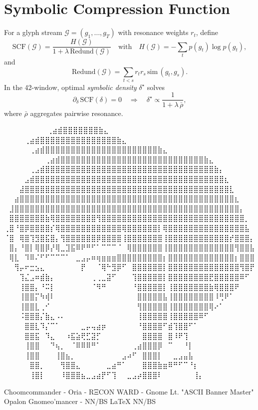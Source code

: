 
\section*{Symbolic Compression Function}

For a glyph stream $\mathcal{G}=(g_1,\dots,g_T)$ with resonance weights $r_t$, define
\[
\mathrm{SCF}(\mathcal{G})= \frac{H(\mathcal{G})}{1+\lambda\,\mathrm{Redund}(\mathcal{G})}
\quad\text{with}\quad
H(\mathcal{G})=-\sum_{t} p(g_t)\log p(g_t),
\]
and
\[
\mathrm{Redund}(\mathcal{G})=\sum_{t<s} r_t r_s\,\mathrm{sim}\,(g_t,g_s).
\]
In the 42-window, optimal \emph{symbolic density} $\delta^\star$ solves
\[
\partial_{\delta}\,\mathrm{SCF}(\delta)=0\quad\Rightarrow\quad
\delta^\star \propto \frac{1}{1+\lambda\,\bar{\rho}},
\]
where $\bar{\rho}$ aggregates pairwise resonance.


\iffalse
⠀⠀⠀⠀⠀⠀             ⠀⠀⢀⣴⣾⣿⣿⣿⣿⣿⣿⣿⣷⣄⠀⠀⠀⠀⠀⠀⠀⠀
⠀⠀⠀  ⠀      ⠀⠀⠀⠀⢀⣴⣾⣿⣿⣿⣿⣿⣿⣿⣿⣿⣿⣿⣿⣿⣿⣿⣷⣄⠀⠀⠀⠀⠀⠀⠀⠀
⠀⠀ ⠀   ⠀⠀⠀⠀⠀⢀⣴⣾⣿⣿⣿⣿⣿⣿⣿⣿⣿⣿⣿⣿⣿⣿⣿⣿⣿⣿⣿⣿⣿⣿⣷⣄⠀⠀⠀⠀⠀⠀⠀⠀
⠀⠀⠀⠀⠀⠀⠀⠀⢀⣴⣾⣿⣿⣿⣿⣿⣿⣿⣿⣿⣿⣿⣿⣿⣿⣿⣿⣿⣿⣿⣿⣿⣿⣿⣿⣿⣿⣿⣿⣷⣄⠀⠀⠀⠀⠀⠀⠀⠀
⠀⠀⠀⠀⠀⢀⣠⣾⣿⣿⣿⣿⣿⣿⣿⣿⣿⣿⣿⣿⣿⣿⣿⣿⣿⣿⣿⣿⣿⣿⣿⣿⣿⣿⣿⣿⣿⣿⣿⣿⣿⣷⡄⠀⠀⠀⠀⠀⠀
⠀⠀⠀⠀⣠⣾⣿⣿⣿⣿⣿⣿⣿⣿⣿⣿⣿⣿⣿⣿⣿⣿⣿⣿⣿⣿⣿⣿⣿⣿⣿⣿⣿⣿⣿⣿⣿⣿⣿⣿⣿⣿⣿⣆⠀⠀⠀⠀⠀
⠀⠀⠀⣼⣿⣿⣿⣿⣿⣿⣿⣿⣿⣿⣿⣿⣿⣿⣿⣿⣿⣿⣿⣿⣿⣿⣿⣿⣿⣿⣿⣿⣿⣿⣿⣿⣿⣿⣿⣿⣿⣿⣿⣿⣇⠀⠀⠀⠀
⠀⠀⣴⣿⣿⣿⣿⣿⣿⣿⣿⣿⣿⣿⣿⣿⣿⣿⣿⣿⣿⣿⣿⣿⣿⣿⣿⣿⣿⣿⣿⣿⣿⣿⣿⣿⣿⣿⣿⣿⣿⣿⣿⣿⣿⣆⠀⠀⠀
⠀⣸⣿⣿⣿⣿⣿⣿⣿⣿⣿⣿⣿⣿⣿⣿⣿⣿⣿⣿⣿⣿⣿⣿⣿⣿⣿⣿⣿⣿⣿⣿⣿⣿⣿⣿⣿⣿⣿⣿⣿⣿⣿⣿⣿⣿⡄⠀⠀
⠀⣿⣿⣿⣿⣿⣿⣿⣷⢿⣿⣿⣿⣿⣿⣿⣿⣿⢻⣿⣿⣿⣿⣿⣿⣿⣿⣿⣿⣿⣿⣿⣿⣿⣿⣿⣿⣿⣿⣿⣿⣿⣿⣿⣿⣿⣿⡀⠀
⢀⣿⠘⣿⡿⣿⣿⣿⣿⡎⢿⣿⣿⣿⣿⣿⣿⣿⣿⣿⣿⣿⣿⢿⣿⣿⣿⣿⣿⣿⡇⢿⣿⣿⣿⣿⣿⣿⣿⣿⣿⣿⣿⣿⣿⣿⣿⣧⠀
⠈⣿⠀⢿⣿⢹⣻⣿⣯⣿⡄⢻⣿⣿⣿⣿⣿⣿⡿⣿⣿⣿⣿⢸⣿⣿⣿⣿⣿⣿⣿⢸⣿⣿⣿⣿⣿⣿⣿⣿⣿⣿⣿⣿⡞⣿⣿⣿⡄
⠀⣿⡄⠘⣿⡇⢿⣿⡿⡜⢿⣀⣹⣯⠿⠟⠛⠋⠁⠉⠉⠉⠈⠀⢿⣿⣿⣿⣿⣿⣿⢸⣿⣿⣿⣿⣿⣿⣿⣿⣿⣿⣿⣿⣿⢻⣿⣿⣧
⠀⢿⣇⠀⠹⠿⠌⠋⠋⠉⠉⠉⠁⠀⣀⣠⡤⠶⢶⣶⣶⣶⣿⣿⣿⣿⣿⣿⣿⣿⣿⡆⣿⣿⣿⣿⣿⣿⣿⣿⣿⣿⣿⣿⣿⡆⣿⣿⣿
⠀⠀⢻⡤⠖⣒⣢⣄⠀⠀⠀⠀⠀⠀⠀⡟⠀⠀⠈⢿⠓⣻⡿⠋⠀⣿⣿⣿⣿⣿⣿⡇⣿⣿⣿⣿⣿⣿⣿⣿⣿⣿⣿⣿⣿⣿⢻⣿⡟
⠀⠀⠀⢹⣌⣠⠶⣾⣷⡄⠀⠀⠀⠀⠀⠀⠀⢀⢀⣀⣽⠋⠀⠀⠀⢹⣿⣿⣿⣿⣿⡇⣿⣿⣿⣿⣿⣿⣿⣿⣟⣿⣿⣿⣿⣿⠿⠋⠀
⠀⠀⠀⢸⣿⣿⡄⠘⠭⡇⠀⠀⠀⠀⠀⠀⠀⠈⠻⠛⠀⠀⠀⠀⠀⠘⣿⣿⣿⣿⣿⡇⢸⣿⣿⣿⣿⣿⣿⣿⣷⢿⣿⣿⣿⠟⠀⠀⠀
⠀⠀⠀⢸⣿⣿⡍⠳⢾⠇⠀⠀⠀⠀⠀⠀⠀⠀⠀⠀⠀⠀⠀⠀⠀⠀⣿⣿⣿⣿⣿⣧⢸⣿⣿⣿⣿⣿⣿⣿⣿⠸⢛⠟⠁⠀⠀⠀⠀
⠀⠀⠀⢸⣿⣿⣇⢀⠊⠀⠀⠀⠀⠀⠀⠀⠀⠀⠀⠀⠀⠀⠀⠀⠀⠀⢻⣿⣿⣿⣿⣿⢸⣿⣿⣿⣿⣿⣿⣿⢿⠔⠁⠀⠀⠀⠀⠀⠀
⠀⠀⠀⠨⣿⣿⣿⡌⣷⣄⠠⠄⠀⠀⠀⠀⠀⠀⠀⠀⠀⠀⠀⠀⠀⠀⢸⣿⣿⣿⣿⣿⢸⣿⣿⣿⣿⣿⠿⠋⠀⠀⠀⠀⠀⠀⠀⠀⠀
⠀⠀⠀⠀⣿⣿⣇⠹⡌⠉⠁⠀⠀⠀⠀⣀⡤⢤⣴⡶⠀⠀⠀⠀⠀⠀⠘⣿⣿⣿⣿⠋⣾⢹⣿⣿⠋⠁⠀⠀⠀⠀⠀⠀⠀⠀⠀⠀⠀
⠀⠀⠀⠀⣿⣿⣯⠀⠹⣄⠀⠀⠰⣯⣵⢟⣋⣽⡋⠀⠀⠀⠀⠀⠀⠀⠀⣿⣿⣿⣿⠀⣿⠸⠟⢹⠀⠀⠀⠀⠀⠀⠀⠀⠀⠀⠀⠀⠀
⠀⠀⠀⠀⢸⣿⣿⠀⠀⠙⢦⡀⠀⠈⠿⠿⠿⠛⠁⠀⠀⠀⠀⠀⠀⢀⣴⣿⣿⣿⡿⠀⠉⠀⠀⠘⡇⠀⠀⠀⠀⠀⠀⠀⠀⠀⠀⠀⠀
⠀⠀⠀⠀⢸⣿⣿⠀⠀⠀⢸⣿⣦⡀⠀⠀⠀⠀⠀⠀⠀⠀⠀⣠⠴⠋⠀⣿⣿⣿⡇⠀⠀⣀⣠⣤⣧⠀⠀⠀⠀⠀⠀⠀⠀⠀⠀⠀⠀
⠀⠀⠀⠀⠀⣿⣿⡀⠀⠀⠀⢻⣿⣿⣄⠀⠀⠀⠀⠀⣀⣴⠛⠁⠀⠀⠀⣿⣿⣿⣷⣶⠿⠛⠋⠉⠘⡆⠀⠀⠀⠀⠀⠀⠀⠀⠀⠀⠀
⠀⠀⠀⠀⠀⢸⣿⡇⠀⠀⠀⠸⣿⣿⣿⣦⣀⣠⣴⡟⠋⢹⠀⠀⣀⣠⡴⣿⣿⣿⠇⠀⠀⠀⠀⠀⠀⢸⡄⠀⠀⠀⠀⠀⠀⠀⠀⠀⠀

Choomcommander - Oria - RΞCON WARD - Gnome Lt. "ASCII Banner Master"
             Opalon Gnomeo'mancer - NN/BS LaTeX{} NN/BS

